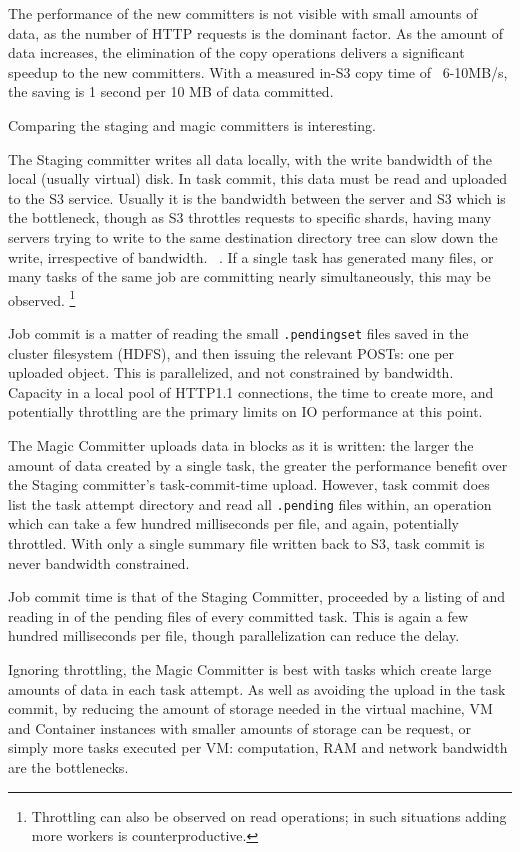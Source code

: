 \documentclass[conference]{IEEEtran}
\begin{document}
The performance of the new committers is not visible with small amounts
of data, as the number of HTTP requests is the dominant factor.
As the amount of data increases, the elimination of the copy operations
delivers a significant speedup to the new committers.
With a measured in-S3 copy time of ~6-10MB/s, the saving is 1 second per 10 MB
of data committed.

Comparing the staging and magic committers is interesting.

The Staging committer writes all data locally, with the write bandwidth
of the local (usually virtual) disk.
In task commit, this data must be read and uploaded to the S3 service.
Usually it is the bandwidth between the server and S3 which is the bottleneck,
though as S3 throttles requests to specific shards, having many servers trying
to write to the same destination directory tree can slow down the write, irrespective
of bandwidth.
\ \cite{AWS-S3-throttling}.
If a single task has generated many files, or many tasks of the same job are
committing nearly simultaneously, this may be observed.
\footnote{Throttling can also be observed on read operations;
in such situations adding more workers is counterproductive.}

Job commit is a matter of reading the small \texttt{.pendingset} files saved in the
cluster filesystem (HDFS), and then issuing the relevant POSTs: one per uploaded
object.
This is parallelized, and not constrained by bandwidth.
Capacity in a local pool of HTTP1.1 connections, the time to create more,
and potentially throttling are the primary limits on IO performance at this point.

The Magic Committer uploads data in blocks as it is written: the larger
the amount of data created by a single task, the greater the performance
benefit over the Staging committer's task-commit-time upload.
However, task commit does list the task attempt directory and read all \texttt{.pending}
files within, an operation which can take a few hundred milliseconds per file,
and again, potentially throttled.
With only a single summary file written back to S3, task commit is never
bandwidth constrained.

Job commit time is that of the Staging Committer, proceeded by a listing
of and reading in of the pending files of every committed task.
This is again a few hundred milliseconds per file, though parallelization
can reduce the delay.

Ignoring throttling, the Magic Committer is best with tasks which create
large amounts of data in each task attempt.
As well as avoiding the upload in the task commit, by reducing the
amount of storage needed in the virtual machine, VM and Container instances
with smaller amounts of storage can be request, or simply more tasks executed
per VM: computation, RAM and network bandwidth are the bottlenecks.
\end{document}
